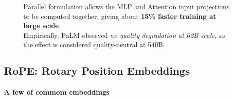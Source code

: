 \begin{figure}[htbp]
\begin{minipage}{0.5\linewidth}
      Parallel formulation allows the MLP and Attention input projections to be computed together, giving about 
      \textbf{15\% faster training at large scale}. \\ 
      Empirically, PaLM observed \textit{no quality degradation at 62B scale}, so the effect is considered quality-neutral at 540B.
  \end{minipage}
\end{figure}


\clearpage
\subsection{RoPE: Rotary Position Embeddings}

\paragraph{A few of commom embeddings}~{}
\\

